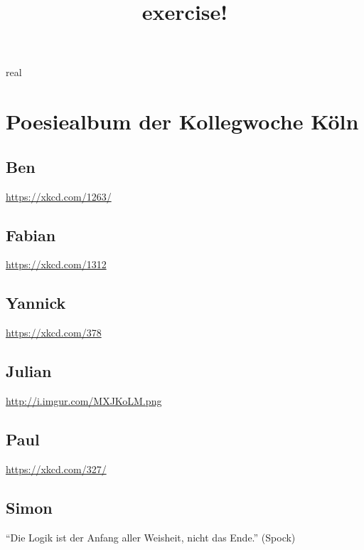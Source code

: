 real \documentclass[12pt]{scrartcl}
\begin{document}
\title{exercise!}
\maketitle
\section{Poesiealbum der Kollegwoche Köln}
\subsection{Ben}
\url{https://xkcd.com/1263/}
\subsection{Fabian}
\url{https://xkcd.com/1312}
\subsection{Yannick}
\url{https://xkcd.com/378}
\subsection{Julian}
\url{http://i.imgur.com/MXJKoLM.png}
\subsection{Paul}
\url{https://xkcd.com/327/}
\subsection{Simon}
``Die Logik ist der Anfang aller Weisheit, nicht das Ende.'' (Spock)
\end{document}
